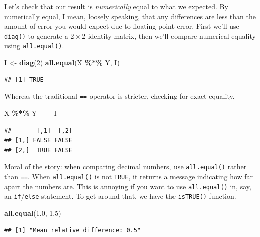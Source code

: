 \documentclass[
  12pt,
  oneside,openany]{book}
\newenvironment{Shaded}{\begin{snugshade}}{\end{snugshade}}
\newcommand{\DecValTok}[1]{\textcolor[rgb]{0.00,0.00,0.81}{#1}}
\newcommand{\FloatTok}[1]{\textcolor[rgb]{0.00,0.00,0.81}{#1}}
\newcommand{\KeywordTok}[1]{\textcolor[rgb]{0.13,0.29,0.53}{\textbf{#1}}}
\newcommand{\NormalTok}[1]{#1}
\newcommand{\OperatorTok}[1]{\textcolor[rgb]{0.81,0.36,0.00}{\textbf{#1}}}
\newcommand{\StringTok}[1]{\textcolor[rgb]{0.31,0.60,0.02}{#1}}
\begin{document}
Let's check that our result is \emph{numerically} equal to what we expected. By numerically equal, I mean, loosely speaking, that any differences are less than the amount of error you would expect due to floating point error. First we'll use \texttt{diag()} to generate a \(2 \times 2\) identity matrix, then we'll compare numerical equality using \texttt{all.equal()}.

\begin{Shaded}
\begin{Highlighting}[]
\NormalTok{I <{-}}\StringTok{ }\KeywordTok{diag}\NormalTok{(}\DecValTok{2}\NormalTok{)}
\KeywordTok{all.equal}\NormalTok{(X }\OperatorTok{\%*\%}\StringTok{ }\NormalTok{Y, I)}
\end{Highlighting}
\end{Shaded}

\begin{verbatim}
## [1] TRUE
\end{verbatim}

Whereas the traditional \texttt{==} operator is stricter, checking for exact equality.

\begin{Shaded}
\begin{Highlighting}[]
\NormalTok{X }\OperatorTok{\%*\%}\StringTok{ }\NormalTok{Y }\OperatorTok{==}\StringTok{ }\NormalTok{I}
\end{Highlighting}
\end{Shaded}

\begin{verbatim}
##       [,1]  [,2]
## [1,] FALSE FALSE
## [2,]  TRUE FALSE
\end{verbatim}

Moral of the story: when comparing decimal numbers, use \texttt{all.equal()} rather than \texttt{==}. When \texttt{all.equal()} is not \texttt{TRUE}, it returns a message indicating how far apart the numbers are. This is annoying if you want to use \texttt{all.equal()} in, say, an \texttt{if}/\texttt{else} statement. To get around that, we have the \texttt{isTRUE()} function.

\begin{Shaded}
\begin{Highlighting}[]
\KeywordTok{all.equal}\NormalTok{(}\FloatTok{1.0}\NormalTok{, }\FloatTok{1.5}\NormalTok{)}
\end{Highlighting}
\end{Shaded}

\begin{verbatim}
## [1] "Mean relative difference: 0.5"
\end{verbatim}
\end{document}
